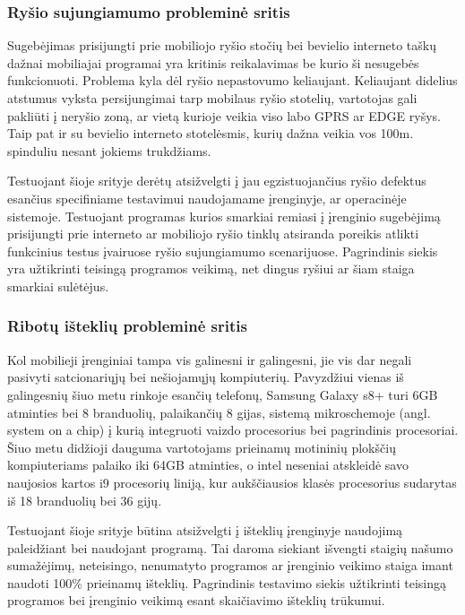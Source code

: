 \documentclass{VUMIFPSkursinis}
\begin{document}
\subsubsection{Ryšio sujungiamumo probleminė sritis}
Sugebėjimas prisijungti prie mobiliojo ryšio stočių bei bevielio interneto taškų dažnai mobiliajai programai yra kritinis reikalavimas be kurio ši nesugebės funkcionuoti. Problema kyla dėl ryšio nepastovumo keliaujant. Keliaujant didelius atstumus vyksta persijungimai tarp mobilaus ryšio stotelių, vartotojas gali pakliūti į neryšio zoną, ar vietą kurioje veikia viso labo GPRS ar EDGE ryšys. Taip pat ir su bevielio interneto stotelėsmis, kurių dažna veikia vos 100m. spinduliu nesant jokiems trukdžiams. 

Testuojant šioje srityje derėtų atsižvelgti į jau egzistuojančius ryšio defektus esančius specifiniame testavimui naudojamame įrenginyje, ar operacinėje sistemoje. \cite{android_bugs} Testuojant programas kurios smarkiai remiasi į įrenginio sugebėjimą prisijungti prie interneto ar mobiliojo ryšio tinklų atsiranda poreikis atlikti funkcinius testus įvairuose ryšio sujungiamumo scenarijuose. Pagrindinis siekis yra užtikrinti teisingą programos veikimą, net dingus ryšiui ar šiam staiga smarkiai sulėtėjus.

\subsubsection{Ribotų išteklių probleminė sritis}
Kol mobilieji įrenginiai tampa vis galinesni ir galingesni, jie vis dar negali pasivyti satcionariųjų bei nešiojamųjų kompiuterių. Pavyzdžiui vienas iš galingesnių šiuo metu rinkoje esančių telefonų, Samsung Galaxy s8+ turi 6GB atminties bei 8 branduolių, palaikančių 8 gijas, sistemą mikroschemoje (angl. system on a chip) į kurią integruoti vaizdo procesorius bei pagrindinis procesoriai. \cite{samsung_s8} Šiuo metu didžioji dauguma vartotojams prieinamų motininių plokščių kompiuteriams palaiko iki 64GB atminties, o intel neseniai atskleidė savo naujosios kartos i9 procesorių liniją, kur aukščiausios klasės procesorius sudarytas iš 18 branduolių bei 36 gijų. \cite{intel_i9}

Testuojant šioje srityje būtina atsižvelgti į išteklių įrenginyje naudojimą paleidžiant bei naudojant programą. Tai daroma siekiant išvengti staigių našumo sumažėjimų, neteisingo, nenumatyto programos ar įrenginio veikimo staiga imant naudoti 100\% prieinamų išteklių. Pagrindinis testavimo siekis užtikrinti teisingą programos bei įrenginio veikimą esant skaičiavimo išteklių trūkumui.
\end{document}
